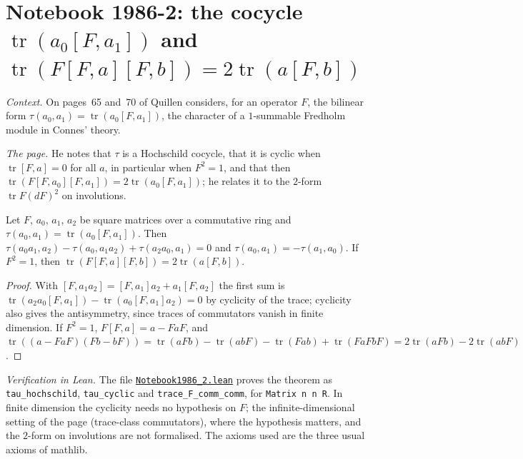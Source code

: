 \section[{Notebook 1986-2: the cocycle $\mathrm{tr}(a_0[F, a_1])$}]{Notebook 1986-2: the cocycle $\operatorname{tr}(a_0[F, a_1])$ and $\operatorname{tr}(F[F,a][F,b]) = 2\operatorname{tr}(a[F,b])$\protect{}}\label{sec:quillen-1986-2}

\emph{Context.} On pages~65 and~70 of  Quillen considers, for an operator $F$, the bilinear form $\tau(a_0, a_1) = \operatorname{tr}(a_0[F, a_1])$, the character of a $1$-summable Fredholm module in Connes' theory.

\emph{The page.} He notes that $\tau$ is a Hochschild cocycle, that it is cyclic when $\operatorname{tr}[F, a] = 0$ for all $a$, in particular when $F^2 = 1$, and that then $\operatorname{tr}(F[F, a_0][F, a_1]) = 2\operatorname{tr}(a_0[F, a_1])$; he relates it to the $2$-form $\operatorname{tr} F(dF)^2$ on involutions.

\begin{encadre}
\begin{theoreme}\label{thm:quillen-1986-2}
Let $F$, $a_0$, $a_1$, $a_2$ be square matrices over a commutative ring and $\tau(a_0, a_1) = \operatorname{tr}(a_0[F, a_1])$. Then $\tau(a_0a_1, a_2) - \tau(a_0, a_1a_2) + \tau(a_2a_0, a_1) = 0$ and $\tau(a_0, a_1) = -\tau(a_1, a_0)$. If $F^2 = 1$, then $\operatorname{tr}(F[F, a][F, b]) = 2\operatorname{tr}(a[F, b])$.
\end{theoreme}
\end{encadre}

\begin{proof}
With $[F, a_1a_2] = [F, a_1]a_2 + a_1[F, a_2]$ the first sum is $\operatorname{tr}(a_2a_0[F,a_1]) - \operatorname{tr}(a_0[F, a_1]a_2) = 0$ by cyclicity of the trace; cyclicity also gives the antisymmetry, since traces of commutators vanish in finite dimension. If $F^2 = 1$, $F[F, a] = a - FaF$, and $\operatorname{tr}((a - FaF)(Fb - bF)) = \operatorname{tr}(aFb) - \operatorname{tr}(abF) - \operatorname{tr}(Fab) + \operatorname{tr}(FaFbF) = 2\operatorname{tr}(aFb) - 2\operatorname{tr}(abF)$.
\end{proof}

\emph{Verification in Lean.} The file \href{\leanblobmain/Notebook1986_2.lean}{\texttt{Notebook1986\_2.\allowbreak{}lean}} proves the theorem as \texttt{tau\_hochschild}, \texttt{tau\_cyclic} and \texttt{trace\_F\_comm\_comm}, for \texttt{Matrix n n R}. In finite dimension the cyclicity needs no hypothesis on $F$; the infinite-dimensional setting of the page (trace-class commutators), where the hypothesis matters, and the $2$-form on involutions are not formalised. The axioms used are the three usual axioms of mathlib.

